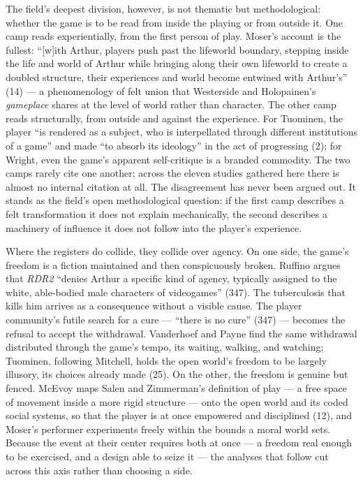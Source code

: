 \documentclass{article}
\begin{document}
The field's deepest division, however, is not thematic but methodological: whether the game is to be read from inside the playing or from outside it. One camp reads experientially, from the first person of play. Moser's account is the fullest: ``[w]ith Arthur, players push past the lifeworld boundary, stepping inside the life and world of Arthur while bringing along their own lifeworld to create a doubled structure, their experiences and world become entwined with Arthur's'' (14) --- a phenomenology of felt union that Westerside and Holopainen's \textit{gameplace} shares at the level of world rather than character.
The other camp reads structurally, from outside and against the experience. For Tuominen, the player ``is rendered as a subject, who is interpellated through different institutions of a game'' and made ``to absorb its ideology'' in the act of progressing (2); for Wright, even the game's apparent self-critique is a branded commodity.
The two camps rarely cite one another; across the eleven studies gathered here there is almost no internal citation at all. The disagreement has never been argued out. It stands as the field's open methodological question: if the first camp describes a felt transformation it does not explain mechanically, the second describes a machinery of influence it does not follow into the player's experience.

Where the registers do collide, they collide over agency. On one side, the game's freedom is a fiction maintained and then conspicuously broken. Ruffino argues that \textit{RDR2} ``denies Arthur a specific kind of agency, typically assigned to the white, able-bodied male characters of videogames'' (347). The tuberculosis that kills him arrives as a consequence without a visible cause. The player community's futile search for a cure --- ``there is no cure'' (347) --- becomes the refusal to accept the withdrawal. Vanderhoef and Payne find the same withdrawal distributed through the game's tempo, its waiting, walking, and watching; Tuominen, following Mitchell, holds the open world's freedom to be largely illusory, its choices already made (25).
On the other, the freedom is genuine but fenced. McEvoy maps Salen and Zimmerman's definition of play --- a free space of movement inside a more rigid structure --- onto the open world and its coded social systems, so that the player is at once empowered and disciplined (12), and Moser's performer experiments freely within the bounds a moral world sets. Because the event at their center requires both at once --- a freedom real enough to be exercised, and a design able to seize it --- the analyses that follow cut across this axis rather than choosing a side.
\end{document}
